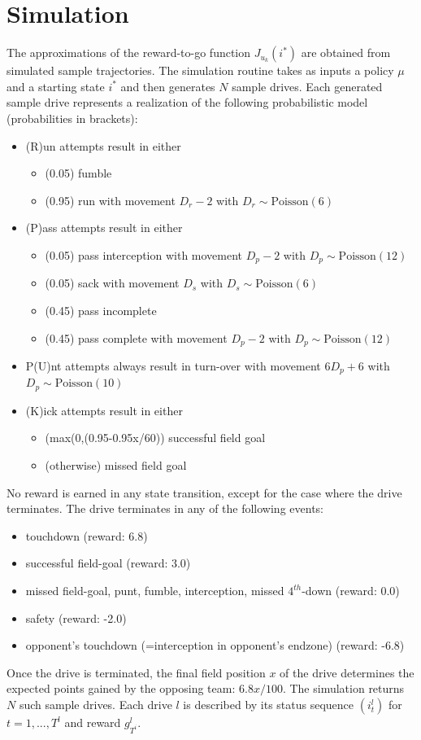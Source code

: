 \documentclass[11pt, oneside]{article}   	%
\begin{document}
\section{Simulation}
The approximations of the reward-to-go function $J_{u_k}(i^*)$ are obtained from simulated sample trajectories. The simulation routine takes as inputs a policy $\mu$ and a starting state $i^*$ and then generates $N$ sample drives. Each generated sample drive represents a realization of the following probabilistic model (probabilities in brackets):
\begin{itemize}
\item (R)un attempts result in either
\begin{itemize}
\item (0.05) fumble
\item (0.95) run with movement $D_r -2$ with $D_r \sim \text{Poisson}(6)$
\end{itemize}
\item (P)ass attempts result in either
\begin{itemize}
\item (0.05) pass interception with movement $D_p -2$ with $D_p \sim \text{Poisson}(12)$
\item (0.05) sack with movement $D_s$ with $D_s \sim \text{Poisson}(6)$
\item (0.45) pass incomplete
\item (0.45) pass complete with movement $D_p -2$ with $D_p \sim \text{Poisson}(12)$
\end{itemize}
\item P(U)nt attempts always result in turn-over with movement $6 D_p + 6$ with $D_p \sim \text{Poisson}(10)$
\item (K)ick attempts result in either
\begin{itemize}
\item (max(0,(0.95-0.95x/60)) successful field goal
\item (otherwise) missed field goal
\end{itemize}
\end{itemize}
No reward is earned in any state transition, except for the case where the drive terminates. The drive terminates in any of the following events:
\begin{itemize}
\item touchdown (reward: 6.8)
\item successful field-goal (reward: 3.0)
\item missed field-goal, punt, fumble, interception, missed $4^{th}$-down (reward: 0.0)
\item safety (reward: -2.0)
\item opponent's touchdown (=interception in opponent's endzone) (reward: -6.8)
\end{itemize}
Once the drive is terminated, the final field position $x$ of the drive determines the expected points gained by the opposing team: $6.8x/100$.
The simulation returns $N$ such sample drives. Each drive $l$ is described by its status sequence $(i_t^l)$ for $t=1,...,T^l$ and reward $g_{T^i}^l$.
\end{document}
